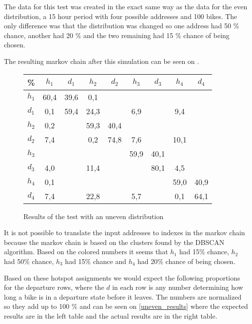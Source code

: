 The data for this test was created in the exact same way as the data for the even distribution, a 15 hour period with four possible addresses and 100 bikes.
The only difference was that the distribution was changed so one address had 50 \% chance, another had 20 \% and the two remaining had 15 \% chance of being chosen.

The resulting markov chain after this simulation can be seen on .

\begin{figure}
	\centering
	\begin{tabular}{|c | c c c c c c c c|}
		\hline
		\% &      $ h_1 $ & $ d_1 $ & $ h_2 $ & $ d_2 $ & $ h_3 $ & $ d_3 $ & $ h_4 $ & $ d_4 $\\
		\hline
		$ h_1 $ & 60,4 &  39,6 &   0,1 &   &   &   &   &  \\
		$ d_1 $ & 0,1 &  59,4 &  {\color{red}24,3} &   &   {\color{red}6,9} &   &   {\color{red}9,4} &  \\
		$ h_2 $ & 0,2 &   &  59,3 &  40,4 &   &   &   &  \\
		$ d_2 $ & {\color{blue}7,4} &   &   0,2 &  74,8 &   {\color{blue}7,6} &   &  {\color{blue}10,1} &  \\
		$ h_3 $ & &   &   &   &  59,9 &  40,1 &   &  \\
		$ d_3 $ & {\color{orange}4,0} &   &  {\color{orange}11,4} &   &   &  80,1 &   {\color{orange}4,5} &  \\
		$ h_4 $ & 0,1 &   &   &   &   &   &  59,0 &  40,9\\
		$ d_4 $ & {\color{purple}7,4} &   &  {\color{purple}22,8} &   &   {\color{purple}5,7} &   &   0,1 &  64,1\\
		\hline
	\end{tabular}
	\caption{Results of the test with an uneven distribution}\label{test_uneven}
\end{figure}

It is not possible to translate the input addresses to indexes in the markov chain because the markov chain is based on the clusters found by the DBSCAN algorithm.
Based on the colored numbers it seems that $ h_1 $ had 15\% chance, $ h_2 $ had 50\% chance, $ h_3 $ had 15\% chance and $ h_4 $ had 20\% chance of being chosen.

Based on these hotspot assignments we would expect the following proportions for the departure rows, where the $ d $ in each row is any number determining how long a bike is in a departure state before it leaves.
The numbers are normalized so they add up to 100 \% and can be seen on \cref{uneven_results} where the expected results are in the left table and the actual results are in the right table.

